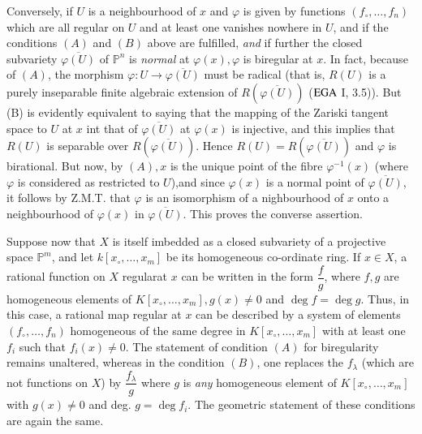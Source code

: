 Conversely, if $U$ is a neighbourhood of $x$ and $\varphi$ is given by
functions $(f_\circ, \ldots , f_n)$ which are all regular on $U$ and at
least one vanishes nowhere in $U$, and if the conditions $(A)$ and
$(B)$ above are fulfilled, \textit{and} if further the closed subvariety
$\overline{\varphi (U)}$ of $\mathbb{P}^n$ is \textit{normal} at
$\varphi(x),\varphi$ is biregular at $x$. In fact, because of $(A)$,
the morphism $\varphi: U \to  \overline{\varphi (U)}$ must be radical
(that is, $R(U)$ is a purely inseparable finite algebraic extension of
$R(\overline{\varphi (U)})$ ($\operatorname{EGA}$ I, 3.5)). But (B) is evidently
equivalent to saying that the mapping of the Zariski tangent space to
$U$ at $x$ int that of $\overline{\varphi (U)}$ at $\varphi(x)$ is
injective, and this implies that $R(U)$ is separable over
$R(\overline{\varphi (U)})$. Hence $R(U) = R(\overline{\varphi (U)})$
and $\varphi$ is birational. But now, by $(A),x$ is the unique point
of the fibre $\varphi^{-1}(x)$ (where $\varphi$ is considered as
restricted to $U$),and since $\varphi(x)$ is a normal point of
$\overline{\varphi (U)}$, it follows by Z.M.T. that $\varphi$ is an
isomorphism of a nighbourhood of $x$ onto a neighbourhood of
$\varphi(x)$ in $\overline{\varphi (U)}$. This proves the converse
assertion. 

Suppose now that $X$ is itself imbedded as a closed subvariety of a
projective space $\mathbb{P}^m$, and let $k [x_\circ, \ldots , x_m ]$ be
its homogeneous co-ordinate ring. If $x \in X$, a rational function on
$X$ regular\pageoriginale at $x$ can be written in the form
$\dfrac{f}{g}$, where 
$f,g$ are homogeneous elements of $K[x_\circ, \ldots , x_m], g(x) \neq 0$
and $\deg f = \deg g$. Thus, in this case, a rational map regular at $x$
can be described by a system of elements $(f_\circ ,\ldots ,f_n)$
homogeneous of the same degree in $K[x_\circ, \ldots , x_m]$ with at least
one $f_i$ such that $f_i(x) \neq 0$. The statement of condition $(A)$
for biregularity remains unaltered, whereas in the condition $(B)$,
one replaces the $f_{\lambda}$ (which are not functions on $X$) by
$\dfrac{f_{\lambda}}{g}$ where $g$ is \textit{any} homogeneous element
of $K[x_\circ, \ldots , x_m]$ with $g(x) \neq 0$ and deg. $g = \deg
f_i$. The geometric statement of these conditions are again the same.  

